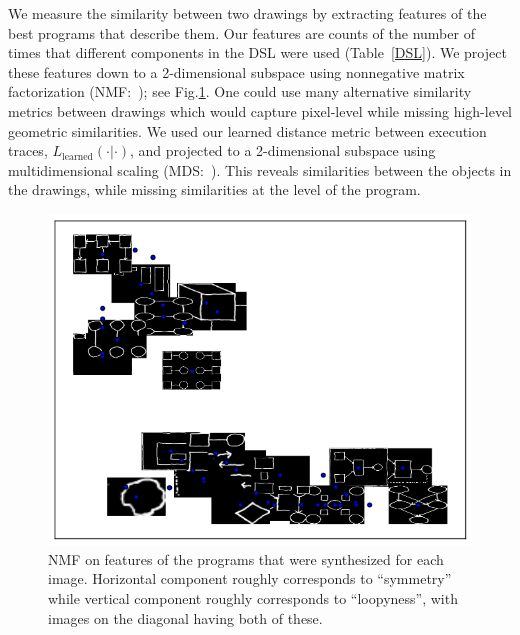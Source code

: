 \documentclass{article}
\begin{document}
We measure the similarity between two drawings by extracting features
of the best programs that describe them. Our features are counts of the number of times that different components in the
DSL were used (Table~\ref{DSL}).  We project these features down to a
2-dimensional subspace using nonnegative matrix factorization
(NMF:~\cite{lee1999learning}); see Fig.\ref{NMF}.  One could use many
alternative similarity metrics between drawings which would capture pixel-level while missing high-level geometric similarities.
We used our learned distance metric between execution traces, $L_{\text{learned}}(\cdot|\cdot)$, and projected to a 2-dimensional subspace using multidimensional scaling (MDS:~\cite{cox2008multidimensional}). This reveals similarities between the objects in the drawings,
while missing similarities at the level of the program.
\begin{figure}
  \begin{minipage}{0.48\textwidth}
    \includegraphics[width = \textwidth]{figures/NMF.png}
    \caption{NMF on features of the programs that were synthesized for each image. Horizontal component roughly corresponds to ``symmetry'' while vertical component roughly corresponds to ``loopyness'', with images on the diagonal having both of these.}    \label{NMF}
  \end{minipage}\hfill
  \begin{minipage}{0.48\textwidth}

\end{minipage}
\end{figure}
\end{document}
